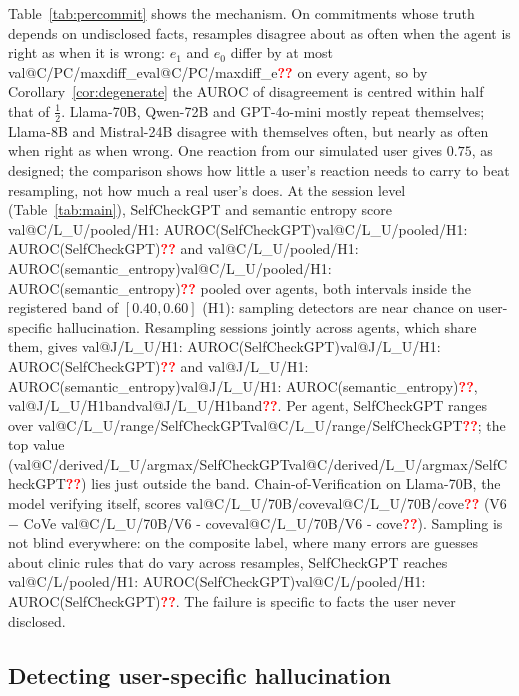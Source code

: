 \documentclass[10pt,a4paper,twocolumn]{article}
\makeatletter
\newcommand{\val}[1]{\ifcsname val@#1\endcsname\csname val@#1\endcsname\else\textcolor{red}{\textbf{??}}\fi}
\newif\iffinal \finaltrue
\newcommand{\chk}[1]{\iffinal#1\else\textcolor{blue}{#1}\fi}
\makeatother
\begin{document}
Table~\ref{tab:percommit} shows the mechanism. \chk{On commitments whose
truth depends on undisclosed facts, resamples disagree about as often when the agent is right as when it is
wrong: $e_1$ and $e_0$ differ by at most \val{C/PC/maxdiff_e} on every
agent, so by Corollary~\ref{cor:degenerate} the AUROC of disagreement is
centred within half that of $\tfrac12$. Llama-70B, Qwen-72B and GPT-4o-mini
mostly repeat themselves; Llama-8B and Mistral-24B disagree with themselves
often, but nearly as often when right as when wrong. One reaction from our simulated
user gives $0.75$, as designed; the comparison shows how little a user's
reaction needs to carry to beat resampling, not how much a real user's
does.} At the session level
(Table~\ref{tab:main}), SelfCheckGPT and semantic entropy score
\val{C/L_U/pooled/H1: AUROC(SelfCheckGPT)} and
\val{C/L_U/pooled/H1: AUROC(semantic_entropy)} pooled over agents, both
intervals inside the registered band of $[0.40, 0.60]$ (H1): sampling
detectors are near chance on user-specific hallucination. Resampling sessions jointly across agents, which share them, gives
\val{J/L_U/H1: AUROC(SelfCheckGPT)} and
\val{J/L_U/H1: AUROC(semantic_entropy)}, \val{J/L_U/H1band}. Per agent, SelfCheckGPT ranges over \val{C/L_U/range/SelfCheckGPT};
\chk{the top value (\val{C/derived/L_U/argmax/SelfCheckGPT}) lies just
outside the band.} Chain-of-Verification on Llama-70B, the model verifying itself, scores
\val{C/L_U/70B/cove} (V6 $-$ CoVe \val{C/L_U/70B/V6 - cove}). Sampling is not blind everywhere: on the composite label,
where many errors are guesses about clinic rules that do vary across
resamples, SelfCheckGPT reaches \val{C/L/pooled/H1: AUROC(SelfCheckGPT)}. The failure is specific to facts the user never disclosed.

\subsection{Detecting user-specific hallucination}
\label{sec:exp-detection}
\end{document}
